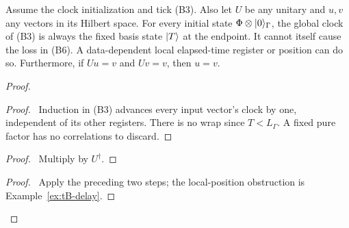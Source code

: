 \begin{lemma}
Assume the clock initialization and tick (B3). Also let $U$ be any
unitary and $u,v$ any vectors in its Hilbert space.
For every initial state $\Phi\otimes\lvert 0\rangle_\Gamma$, the global clock
of (B3) is always the fixed basis
state $\lvert T\rangle$ at the endpoint. It cannot itself cause the loss in (B6).
A data-dependent local elapsed-time register or position can do so.
Furthermore, if $Uu=v$ and $Uv=v$, then $u=v$.
\end{lemma}
\begin{proof}
 \begin{proof}\pf\ Induction in (B3) advances every input vector's
 clock by one, independent of its other registers. There is no wrap
 since $T<L_{\Gamma}$. A fixed pure factor has no correlations to discard.
 \end{proof}
 \begin{proof}\pf\ Multiply by $U^\dagger$.\end{proof}
 \qedstep
 \begin{proof}\pf\ Apply the preceding two steps; the local-position
 obstruction is Example~\ref{ex:tB-delay}.\end{proof}
\end{proof}

